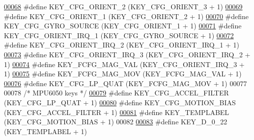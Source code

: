 \begin{DoxyCode}
\hypertarget{dmp_key_8h_source.tex_l00068}{}\hyperlink{dmp_key_8h_a82b40f1055d41ed86fa0072fa9f76256}{00068} \textcolor{preprocessor}{#define KEY\_CFG\_ORIENT\_2            (KEY\_CFG\_ORIENT\_3 + 1)}
\hypertarget{dmp_key_8h_source.tex_l00069}{}\hyperlink{dmp_key_8h_a28f73c835e6c16e3998bc5daee542cc4}{00069} \textcolor{preprocessor}{#define KEY\_CFG\_ORIENT\_1            (KEY\_CFG\_ORIENT\_2 + 1)}
\hypertarget{dmp_key_8h_source.tex_l00070}{}\hyperlink{dmp_key_8h_ad6e6d13e3c7505e27e9cd310b7dc69f9}{00070} \textcolor{preprocessor}{#define KEY\_CFG\_GYRO\_SOURCE         (KEY\_CFG\_ORIENT\_1 + 1)}
\hypertarget{dmp_key_8h_source.tex_l00071}{}\hyperlink{dmp_key_8h_a214abdd061d834dbee6f8d804585cdd8}{00071} \textcolor{preprocessor}{#define KEY\_CFG\_ORIENT\_IRQ\_1        (KEY\_CFG\_GYRO\_SOURCE + 1)}
\hypertarget{dmp_key_8h_source.tex_l00072}{}\hyperlink{dmp_key_8h_a629f9aa58f13d9d70d82da360ef8a2ac}{00072} \textcolor{preprocessor}{#define KEY\_CFG\_ORIENT\_IRQ\_2        (KEY\_CFG\_ORIENT\_IRQ\_1 + 1)}
\hypertarget{dmp_key_8h_source.tex_l00073}{}\hyperlink{dmp_key_8h_a841eaa472f5eea819364b8a52e4f375d}{00073} \textcolor{preprocessor}{#define KEY\_CFG\_ORIENT\_IRQ\_3        (KEY\_CFG\_ORIENT\_IRQ\_2 + 1)}
\hypertarget{dmp_key_8h_source.tex_l00074}{}\hyperlink{dmp_key_8h_a5c00ed33c857436d4d62d4a43cc0551f}{00074} \textcolor{preprocessor}{#define KEY\_FCFG\_MAG\_VAL            (KEY\_CFG\_ORIENT\_IRQ\_3 + 1)}
\hypertarget{dmp_key_8h_source.tex_l00075}{}\hyperlink{dmp_key_8h_ad7299dd182e8feb57a9a5026d356cd5f}{00075} \textcolor{preprocessor}{#define KEY\_FCFG\_MAG\_MOV            (KEY\_FCFG\_MAG\_VAL + 1)}
\hypertarget{dmp_key_8h_source.tex_l00076}{}\hyperlink{dmp_key_8h_aa1976f8770a8d7a6fe33d911df1a7e71}{00076} \textcolor{preprocessor}{#define KEY\_CFG\_LP\_QUAT             (KEY\_FCFG\_MAG\_MOV + 1)}
00077 
00078 \textcolor{comment}{/* MPU6050 keys */}
\hypertarget{dmp_key_8h_source.tex_l00079}{}\hyperlink{dmp_key_8h_ac0902228305c8c231e322e1a25ac5ee7}{00079} \textcolor{preprocessor}{#define KEY\_CFG\_ACCEL\_FILTER        (KEY\_CFG\_LP\_QUAT + 1)}
\hypertarget{dmp_key_8h_source.tex_l00080}{}\hyperlink{dmp_key_8h_a941389ecdbed59f71ff7eda4e65291d5}{00080} \textcolor{preprocessor}{#define KEY\_CFG\_MOTION\_BIAS         (KEY\_CFG\_ACCEL\_FILTER + 1)}
\hypertarget{dmp_key_8h_source.tex_l00081}{}\hyperlink{dmp_key_8h_a57995608a071771b3bb0ac1ea29c1656}{00081} \textcolor{preprocessor}{#define KEY\_TEMPLABEL               (KEY\_CFG\_MOTION\_BIAS + 1)}
00082 
\hypertarget{dmp_key_8h_source.tex_l00083}{}\hyperlink{dmp_key_8h_af0873c8b363dd566dc21032860193300}{00083} \textcolor{preprocessor}{#define KEY\_D\_0\_22                  (KEY\_TEMPLABEL + 1)}

\end{DoxyCode}
